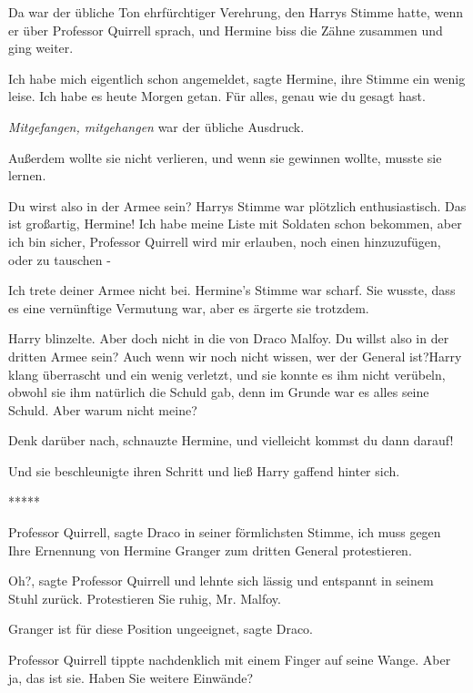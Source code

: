 Da war der übliche Ton ehrfürchtiger Verehrung, den Harrys Stimme hatte, wenn er
über Professor Quirrell sprach, und Hermine biss die Zähne zusammen und ging
weiter.

\glqq{}Ich habe mich eigentlich schon angemeldet\grqq{}, sagte Hermine, ihre
Stimme ein wenig leise. \glqq{}Ich habe es heute Morgen getan. Für alles, genau
wie du gesagt hast.\grqq{}

\emph{Mitgefangen, mitgehangen} war der übliche Ausdruck.

Außerdem wollte sie nicht verlieren, und wenn sie gewinnen wollte, musste sie
lernen.

\glqq{}Du wirst also in der Armee sein?\grqq{} Harrys Stimme war plötzlich
enthusiastisch. \glqq{}Das ist großartig, Hermine! Ich habe meine Liste mit
Soldaten schon bekommen, aber ich bin sicher, Professor Quirrell wird mir
erlauben, noch einen hinzuzufügen, oder zu tauschen -\grqq{}

\glqq{}Ich trete deiner Armee nicht bei.\grqq{} Hermine's Stimme war scharf. Sie
wusste, dass es eine vernünftige Vermutung war, aber es ärgerte sie trotzdem.

Harry blinzelte. \glqq{}Aber doch nicht in die von Draco Malfoy. Du willst also
in der dritten Armee sein? Auch wenn wir noch nicht wissen, wer der General
ist?\grqq{}Harry klang überrascht und ein wenig verletzt, und sie konnte es ihm
nicht verübeln, obwohl sie ihm natürlich die Schuld gab, denn im Grunde war es
alles seine Schuld. \glqq{}Aber warum nicht meine?\grqq{}

\glqq{}Denk darüber nach\grqq{}, schnauzte Hermine, \glqq{}und vielleicht kommst
du dann darauf!\grqq{}

Und sie beschleunigte ihren Schritt und ließ Harry gaffend hinter sich.

\begin{center}*****\end{center}

\glqq{}Professor Quirrell\grqq{}, sagte Draco in seiner förmlichsten Stimme,
\glqq{}ich muss gegen Ihre Ernennung von Hermine Granger zum dritten General
protestieren.\grqq{}

\glqq{}Oh?\grqq{}, sagte Professor Quirrell und lehnte sich lässig und entspannt
in seinem Stuhl zurück. \glqq{}Protestieren Sie ruhig, Mr. Malfoy.\grqq{}

\glqq{}Granger ist für diese Position ungeeignet\grqq{}, sagte Draco.

Professor Quirrell tippte nachdenklich mit einem Finger auf seine Wange. \glqq{}
Aber ja, das ist sie. Haben Sie weitere Einwände?\grqq{}

